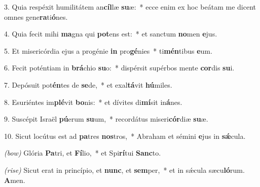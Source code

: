 3. Quia respéxit humilitátem an\textbf{cíl}læ \textbf{su}æ:~*
	ecce enim ex hoc beátam me dicent omnes gene\textbf{ra}ti\textbf{ó}nes.

4. Quia fecit mihi \textbf{ma}gna qui \textbf{pot}ens est:~*
	et sanctum \textbf{no}men \textbf{e}jus.

5. Et misericórdia ejus a progénie \textbf{in} pro\textbf{gé}nies~*
	ti\textbf{mén}tibus \textbf{e}um.

6. Fecit poténtiam in \textbf{brá}chio \textbf{su}o:~*
	dispérsit supérbos mente \textbf{cor}dis \textbf{su}i.

7. Depósuit pot\textbf{én}tes de \textbf{se}de,~*
	et exal\textbf{tá}vit \textbf{hú}miles.

8. Esuriéntes im\textbf{plé}vit \textbf{bo}nis:~*
	et dívites di\textbf{mí}sit in\textbf{á}nes.

9. Suscépit Israël \textbf{pú}erum \textbf{su}um,~*
	recordátus miseri\textbf{cór}diæ \textbf{su}æ.

10. Sicut locútus est ad \textbf{pa}tres \textbf{nos}tros,~*
	Abraham et sémini \textbf{e}jus in \textbf{s\'{\ae}}cula.

\textit{(bow)} Glória \textbf{Pa}tri, et \textbf{Fí}lio,~*
	et Spi\textbf{rí}tui \textbf{Sanc}to.
	
\textit{(rise)} Sicut erat in princípio, et \textbf{nunc}, et \textbf{sem}per,~*
	et in s\'{\ae}cula sæcu\textbf{ló}rum. \textbf{A}men.